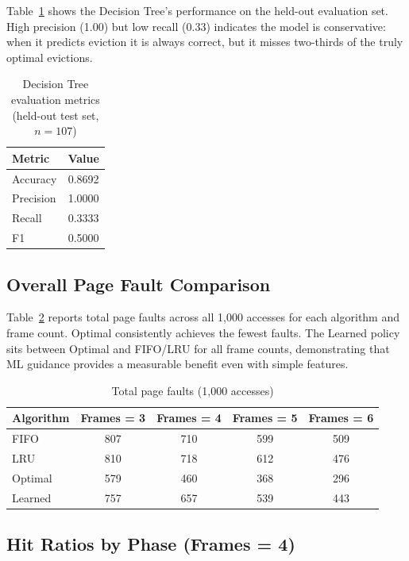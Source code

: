 \documentclass[12pt,a4paper]{article}
\begin{document}
Table~\ref{tab:model} shows the Decision Tree's performance on the held-out
evaluation set. High precision (1.00) but low recall (0.33) indicates the
model is conservative: when it predicts eviction it is always correct, but
it misses two-thirds of the truly optimal evictions.

\begin{table}[h]
\centering
\caption{Decision Tree evaluation metrics (held-out test set, $n=107$)}
\label{tab:model}
\begin{tabular}{lc}
\toprule
Metric & Value \\
\midrule
Accuracy  & 0.8692 \\
Precision & 1.0000 \\
Recall    & 0.3333 \\
F1        & 0.5000 \\
\bottomrule
\end{tabular}
\end{table}

\subsection{Overall Page Fault Comparison}

Table~\ref{tab:overall} reports total page faults across all 1{,}000 accesses
for each algorithm and frame count. Optimal consistently achieves the fewest
faults. The Learned policy sits between Optimal and FIFO/LRU for all frame
counts, demonstrating that ML guidance provides a measurable benefit even with
simple features.

\begin{table}[h]
\centering
\caption{Total page faults (1{,}000 accesses)}
\label{tab:overall}
\begin{tabular}{lcccc}
\toprule
Algorithm & Frames = 3 & Frames = 4 & Frames = 5 & Frames = 6 \\
\midrule
FIFO    & 807 & 710 & 599 & 509 \\
LRU     & 810 & 718 & 612 & 476 \\
Optimal & 579 & 460 & 368 & 296 \\
Learned & 757 & 657 & 539 & 443 \\
\bottomrule
\end{tabular}
\end{table}

\subsection{Hit Ratios by Phase (Frames = 4)}
\end{document}
